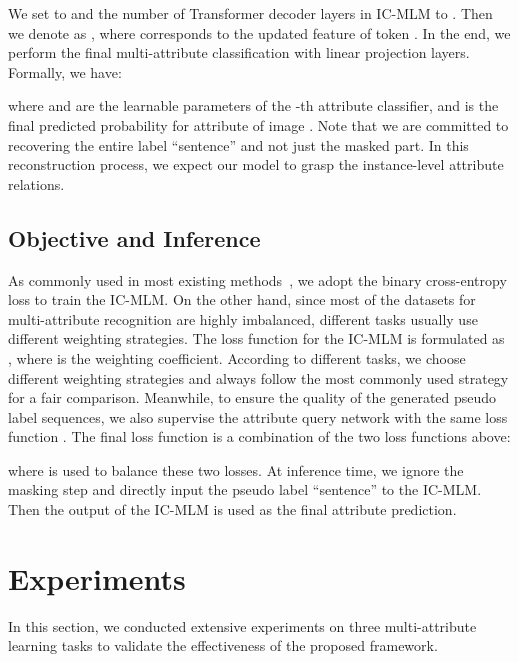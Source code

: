 \documentclass[runningheads]{llncs}
\begin{document}
We set  to  and the number of Transformer decoder layers in IC-MLM to .
Then we denote  as , where  corresponds to the updated feature of token .
In the end, we perform the final multi-attribute classification with linear projection layers.
Formally, we have:

where  and  are the learnable parameters of the -th attribute classifier, and  is the final predicted probability for attribute  of image .
Note that we are committed to recovering the entire label ``sentence'' and not just the masked part. In this reconstruction process, we expect our model to grasp the instance-level attribute relations.


\subsection{Objective and Inference}
As commonly used in most existing methods~\cite{jia2021spatial,sarafianos2018deep,liu2015deep}, we adopt the binary cross-entropy loss to train the IC-MLM. On the other hand, since most of the datasets for multi-attribute recognition are highly imbalanced, different tasks usually use different weighting strategies. The loss function for the IC-MLM is formulated as ,
where  is the weighting coefficient. According to different tasks, we choose different weighting strategies and always follow the most commonly used strategy for a fair comparison. Meanwhile, to ensure the quality of the generated pseudo label sequences, we also supervise the attribute query network with the same loss function .
The final loss function  is a combination of the two loss functions above:

where  is used to balance these two losses.
At inference time, we ignore the masking step and directly input the pseudo label ``sentence'' to the IC-MLM. Then the output of the IC-MLM is used as the final attribute prediction.






\section{Experiments}
In this section, we conducted extensive experiments on three multi-attribute learning tasks to validate the effectiveness of the proposed framework.
\end{document}
